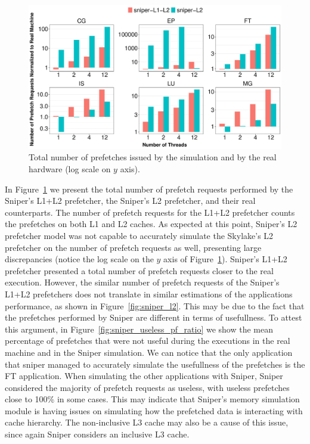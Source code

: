 \documentclass[AMA,final,STIX1COL]{WileyNJD-v2}
\begin{document}
\begin{figure}[b]
    \centering
    \includegraphics[width=\linewidth]{figures/fig99.pdf}
    \caption{Total number of prefetches issued by the simulation and by the real hardware (log scale on $y$ axis).}
    \label{fig:sniper_l2-rqsts-all-pf}
\end{figure}


In Figure~\ref{fig:sniper_l2-rqsts-all-pf} we present the total number of prefetch requests performed by the Sniper's L1+L2 prefetcher, the Sniper's L2 prefetcher, and their real counterparts. The number of prefetch requests for the L1+L2 prefetcher counts the prefetches on both L1 and L2 caches.
As expected at this point, Sniper's L2 prefetcher model was not capable to accurately simulate the Skylake's L2 prefetcher on the number of prefetch requests as well, presenting large discrepancies (notice the log scale on the $y$ axis of Figure~\ref{fig:sniper_l2-rqsts-all-pf}).
Sniper's L1+L2 prefetcher presented a total number of prefetch requests closer to the real execution. 
However, the similar number of prefetch requests of the Sniper's L1+L2 prefetchers does not translate in similar estimations of the applications performance, as shown in Figure~\ref{fig:sniper_l2}.
This may be due to the fact that the prefetches performed by Sniper are different in terms of usefullness. 
To attest this argument, in Figure~\ref{fig:sniper_useless_pf_ratio} we show the mean percentage of prefetches that were not useful during the executions in the real machine and in the Sniper simulation.
We can notice that the only application that sniper managed to accurately simulate the usefullness of the prefetches is the FT application.
When simulating the other applications with Sniper, Sniper considered the majority of prefetch requests as useless, with useless prefetches close to 100\% in some cases. 
This may indicate that Sniper's memory simulation module is having issues on simulating how the prefetched data is interacting with cache hierarchy. 
The non-inclusive L3 cache may also be a cause of this issue, since again Sniper considers an inclusive L3 cache.
\end{document}
